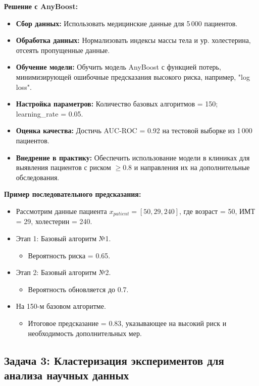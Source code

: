 \textbf{Решение с AnyBoost:}
\begin{itemize}
    \item \textbf{Сбор данных:} Использовать медицинские данные для 5\,000 пациентов.
    \item \textbf{Обработка данных:} Нормализовать индексы массы тела и ур. холестерина, отсеять пропущенные данные.
    \item \textbf{Обучение модели:} Обучить модель AnyBoost с функцией потерь, минимизирующей ошибочные предсказания высокого риска, например, "log loss".
    \item \textbf{Настройка параметров:} Количество базовых алгоритмов = 150; learning\_rate = 0.05.
    \item \textbf{Оценка качества:} Достичь AUC-ROC = 0.92 на тестовой выборке из 1\,000 пациентов.
    \item \textbf{Внедрение в практику:} Обеспечить использование модели в клиниках для выявления пациентов с риском $\geq 0.8$ и направления их на дополнительные обследования.
\end{itemize}

\textbf{Пример последовательного предсказания:}
\begin{itemize}
    \item Рассмотрим данные пациента $x_{patient} = [50, 29, 240]$, где возраст = 50, ИМТ = 29, холестерин = 240.
    \item Этап 1: Базовый алгоритм №1.
          \begin{itemize}
              \item Вероятность риска = 0.65.
          \end{itemize}
    \item Этап 2: Базовый алгоритм №2.
          \begin{itemize}
              \item Вероятность обновляется до 0.7.
          \end{itemize}
    \item На 150-м базовом алгоритме.
          \begin{itemize}
              \item Итоговое предсказание = 0.83, указывающее на высокий риск и необходимость дополнительных мер.
          \end{itemize}
\end{itemize}


\subsection*{Задача 3: Кластеризация экспериментов для анализа научных данных}

